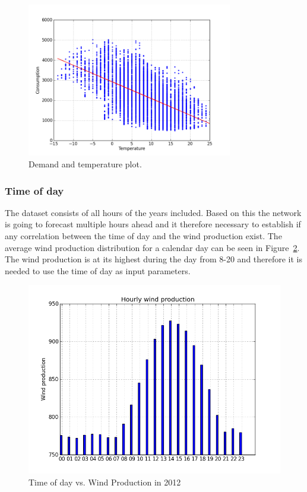 \begin{figure}[H]
\centering
\includegraphics[width=0.8\textwidth ,natwidth=410,natheight=237]{billeder/energy_price_plots/consump_temp.png}
\caption{Demand and temperature plot.}
\label{fig:consump_temp_green}
\end{figure}

\subsubsection{Time of day}
\label{sec:greenTOD}
The dataset consists of all hours of the years included. Based on this the network is going to forecast multiple hours ahead and it therefore necessary to establish if any correlation between the time of day and the wind production exist. The average wind production distribution for a calendar day can be seen in Figure~\ref{fig:hourly_wind_production}. The wind production is at its highest during the day from 8-20 and therefore it is needed to use the time of day as input parameters.  

\begin{figure}[H]
\centering
\includegraphics[width=0.99\linewidth,natwidth=898,natheight=587]{billeder/hourly_wind_production.png}
\caption{Time of day vs. Wind Production in 2012}
\label{fig:hourly_wind_production}
\end{figure}

